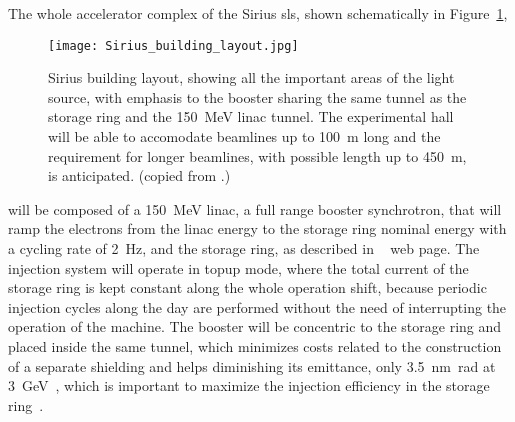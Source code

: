     The whole accelerator complex of the Sirius \gls{sls}, shown schematically in Figure~\ref{fig:accelerator_complex},
    \begin{figure}[t!]
        \centering
        \texttt{[image: Sirius\_building\_layout.jpg]}
        \caption[Sirius building layout.]{Sirius building layout, showing all the important areas of the light source, with emphasis to the booster sharing the same tunnel as the storage ring and the \SI{150}{\mega\electronvolt} \gls{linac} tunnel. The experimental hall will be able to accomodate beamlines up to \SI{100}{\meter} long and the requirement for longer beamlines, with possible length up to \SI{450}{\meter}, is anticipated. (copied from .)}
        \label{fig:accelerator_complex}
    \end{figure}
    will be composed of a \SI{150}{\mega\electronvolt} \gls{linac}, a full range booster synchrotron, that will ramp the electrons from the \gls{linac} energy to the storage ring nominal energy with a cycling rate of \SI{2}{\hertz}, and the storage ring, as described in ~ web page. The injection system will operate in topup mode, where the total current of the storage ring is kept constant along the whole operation shift, because periodic injection cycles along the day are performed without the need of interrupting the operation of the machine. The booster will be concentric to the storage ring and placed inside the same tunnel, which minimizes costs related to the construction of a separate shielding and helps diminishing its emittance, only \SI{3.5}{\nano\meter\radian} at \SI{3}{\giga\electronvolt}~\cite{Sa2014a}, which is important to maximize the injection efficiency in the storage ring~\cite{Liu2016a}.

